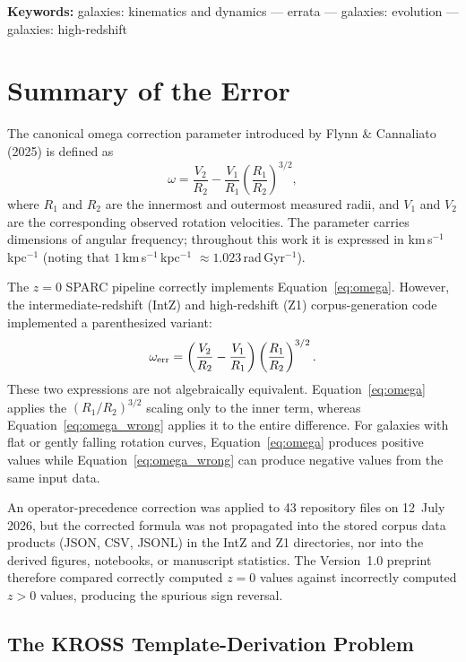 \documentclass[a4paper,12pt]{article}
\newcommand{\om}{\omega}
\newcommand{\omunit}{km\,s$^{-1}$\,kpc$^{-1}$}
\begin{document}
\textbf{Keywords:} galaxies: kinematics and dynamics --- errata ---
galaxies: evolution --- galaxies: high-redshift

\section{Summary of the Error}
\label{sec:error}

The canonical omega correction parameter introduced by
Flynn \& Cannaliato (2025) is defined as
\begin{equation}
  \om = \frac{V_2}{R_2} - \frac{V_1}{R_1}\left(\frac{R_1}{R_2}\right)^{3/2},
  \label{eq:omega}
\end{equation}
where $R_1$ and $R_2$ are the innermost and outermost measured radii,
and $V_1$ and $V_2$ are the corresponding observed rotation velocities.
The parameter carries dimensions of angular frequency; throughout this
work it is expressed in \omunit{} (noting that
$1$\,km\,s$^{-1}$\,kpc$^{-1}$ $\approx 1.023$\,rad\,Gyr$^{-1}$).

The $z=0$ SPARC pipeline correctly implements
Equation~\ref{eq:omega}. However, the intermediate-redshift (IntZ)
and high-redshift (Z1) corpus-generation code implemented a
parenthesized variant:
\begin{equation}
  \om_{\rm err} = \left(\frac{V_2}{R_2} - \frac{V_1}{R_1}\right)
                  \left(\frac{R_1}{R_2}\right)^{3/2}.
  \label{eq:omega_wrong}
\end{equation}
These two expressions are not algebraically equivalent.
Equation~\ref{eq:omega} applies the $(R_1/R_2)^{3/2}$ scaling only
to the inner term, whereas Equation~\ref{eq:omega_wrong} applies it
to the entire difference. For galaxies with flat or gently falling
rotation curves, Equation~\ref{eq:omega} produces positive values
while Equation~\ref{eq:omega_wrong} can produce negative values from
the same input data.

An operator-precedence correction was applied to 43 repository files
on 12~July 2026, but the corrected formula was not propagated into
the stored corpus data products (JSON, CSV, JSONL) in the IntZ and
Z1 directories, nor into the derived figures, notebooks, or
manuscript statistics. The Version~1.0 preprint therefore compared
correctly computed $z=0$ values against incorrectly computed
$z>0$ values, producing the spurious sign reversal.

\subsection{The KROSS Template-Derivation Problem}
\end{document}
